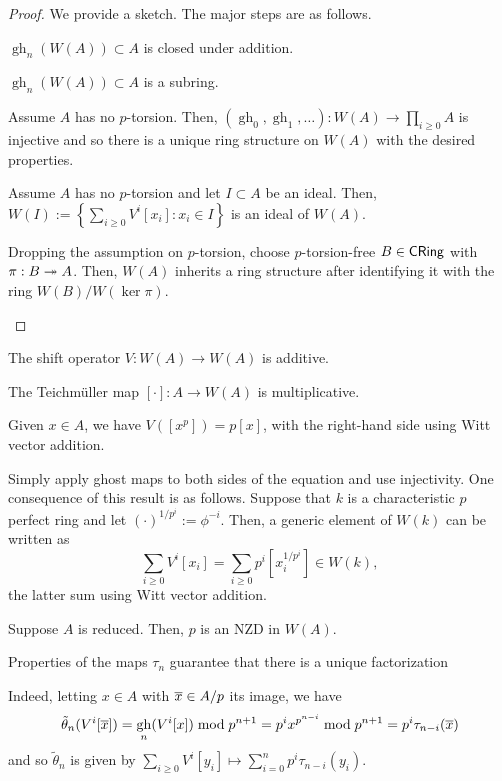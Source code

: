 \documentclass[11pt]{article}
\DeclareMathOperator{\gh}{gh}
\begin{document}
\begin{proof}
We provide a sketch. The major steps are as follows.
\begin{enum}{\arabic}
\item $\gh_n(W(A))\subset A$ is closed under addition.
\item $\gh_n(W(A))\subset A$ is a subring.
\item Assume $A$ has no $p$-torsion. Then, $(\gh_0,\gh_1,\ldots): W(A)\to\prod_{i\geq0}A$ is injective and so there is a unique ring structure on $W(A)$ with the desired properties.
\item Assume $A$ has no $p$-torsion and let $I\subset A$ be an ideal. Then, $W(I):=\left\{\sum_{i\geq0}V^i[x_i] : x_i\in I\right\}$ is an ideal of $W(A)$.
\item Dropping the assumption on $p$-torsion, choose $p$-torsion-free $B\in\operatorname{\mathsf{CRing}}$ with $\pi: B\twoheadrightarrow A$. Then, $W(A)$ inherits a ring structure after identifying it with the ring $W(B)/W(\ker\pi)$.
\end{enum}
\end{proof}

\begin{claim}
The shift operator $V: W(A)\to W(A)$ is additive.
\end{claim}

\begin{claim}
The Teichm\"{u}ller map $[\cdot]: A\to W(A)$ is multiplicative.
\end{claim}

\begin{lemma}
Given $x\in A$, we have $V([x^p])=p[x]$, with the right-hand side using Witt vector addition.
\end{lemma}

Simply apply ghost maps to both sides of the equation and use injectivity. One consequence of this result is as follows. Suppose that $k$ is a characteristic $p$ perfect ring and let $(\cdot)^{1/p^i}:=\phi^{-i}$. Then, a generic element of $W(k)$ can be written as 
$$\sum_{i\geq0}V^i[x_i]=\sum_{i\geq0}p^i[x_i^{1/p^i}]\in W(k),$$
the latter sum using Witt vector addition.

\begin{corollary}
Suppose $A$ is reduced. Then, $p$ is an NZD in $W(A)$.
\end{corollary}

Properties of the maps $\tau_n$ guarantee that there is a unique factorization
\begin{center}
\end{center}
Indeed, letting $x\in A$ with $\overline{x}\in A/p$ its image, we have 
$$\tilde{\theta}_n(V^i[\ov{x}])=\gh_n(V^i[x])\bmod{p^{n+1}}=p^ix^{p^{n-i}}\bmod{p^{n+1}}=p^i\tau_{n-i}(\ov{x})$$
and so $\tilde{\theta}_n$ is given by $\sum_{i\geq0}V^i[y_i]\mapsto\sum_{i=0}^np^i\tau_{n-i}(y_i)$.
\end{document}
